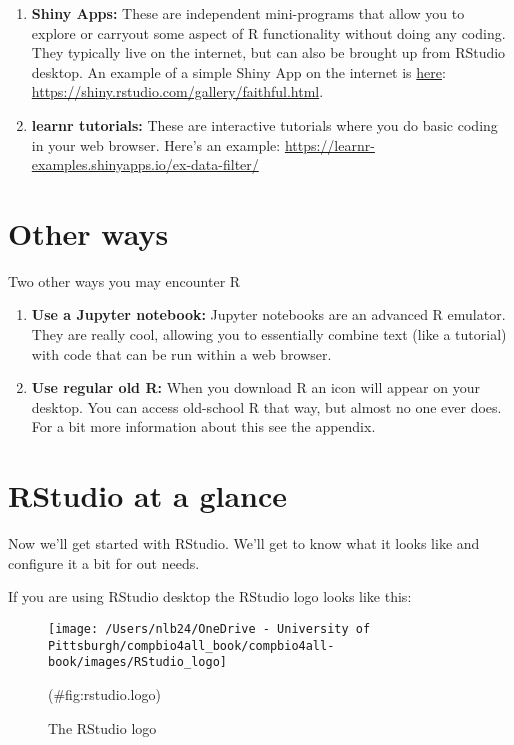 \documentclass[
]{book}
\providecommand{\tightlist}{%
  \setlength{\itemsep}{0pt}\setlength{\parskip}{0pt}}
\begin{document}
\begin{enumerate}
\def\labelenumi{\arabic{enumi}.}
\tightlist
\item
  \textbf{Shiny Apps:} These are independent mini-programs that allow you to explore or carryout some aspect of R functionality without doing any coding. They typically live on the internet, but can also be brought up from RStudio desktop. An example of a simple Shiny App on the internet is \href{https://shiny.rstudio.com/gallery/faithful.html}{here}: \url{https://shiny.rstudio.com/gallery/faithful.html}.
\item
  \textbf{learnr tutorials:} These are interactive tutorials where you do basic coding in your web browser. Here's an example: \url{https://learnr-examples.shinyapps.io/ex-data-filter/}
\end{enumerate}

\hypertarget{other-ways}{%
\section{Other ways}\label{other-ways}}

Two other ways you may encounter R

\begin{enumerate}
\def\labelenumi{\arabic{enumi}.}
\tightlist
\item
  \textbf{Use a Jupyter notebook:} Jupyter notebooks are an advanced R emulator. They are really cool, allowing you to essentially combine text (like a tutorial) with code that can be run within a web browser.\\
\item
  \textbf{Use regular old R:} When you download R an icon will appear on your desktop. You can access old-school R that way, but almost no one ever does. For a bit more information about this see the appendix.
\end{enumerate}

\hypertarget{rstudio-at-a-glance}{%
\section{RStudio at a glance}\label{rstudio-at-a-glance}}

Now we'll get started with RStudio. We'll get to know what it looks like and configure it a bit for out needs.

If you are using RStudio desktop the RStudio logo looks like this:

\begin{figure}
\texttt{[image: /Users/nlb24/OneDrive - University of Pittsburgh/compbio4all\_book/compbio4all-book/images/RStudio\_logo]} \caption{The RStudio logo}(\#fig:rstudio.logo)
\end{figure}
\end{document}
